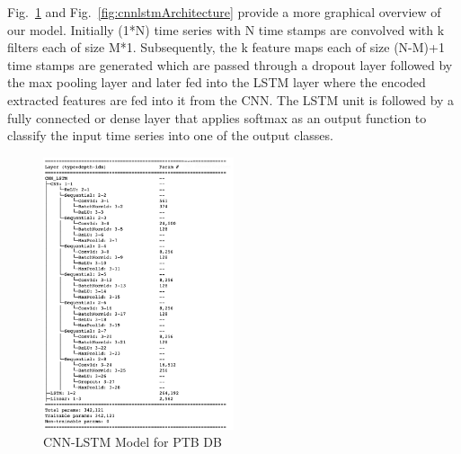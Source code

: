 \documentclass{ieeeaccess}
\begin{document}
Fig.~\ref{fig:CNN-LSTM} and Fig.~\ref{fig:cnnlstmArchitecture} provide a more graphical overview of our model. Initially (1*N) time series with N time stamps are convolved with k filters each of size M*1. Subsequently, the k feature maps each of size (N-M)+1 time stamps are generated which are passed through a dropout layer followed by the max pooling layer and later fed into the LSTM layer where the encoded extracted features are fed into it from the CNN. The LSTM unit is followed by a fully connected or dense layer that applies softmax as an output function to classify the input time series into one of the output classes.
\begin{figure}[!ht]
\includegraphics[width=0.5\textwidth]{Images/cnn-lstm.png}
\caption{CNN-LSTM Model for PTB DB}
\label{fig:CNN-LSTM}
\end{figure} 

\end{document}
